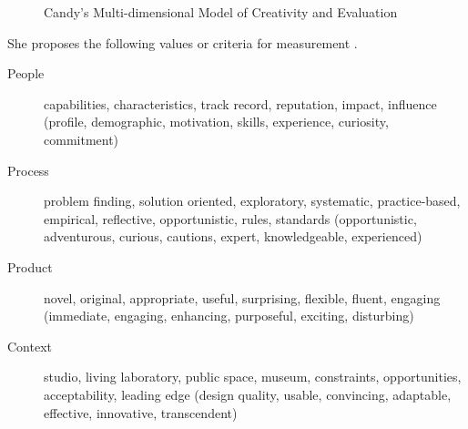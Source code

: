 \begin{figure}[!htbp]
  \caption[Candy's MMCE]{Candy's Multi-dimensional Model of Creativity and Evaluation}
  \label{fig:mmce}
\end{figure}

She proposes the following values or criteria for measurement \citeyear{Candy2012}.

\begin{description}
  \item [People] capabilities, characteristics, track record, reputation, impact, influence (profile, demographic, motivation, skills, experience, curiosity, commitment)
  \item [Process] problem finding, solution oriented, exploratory, systematic, practice-based, empirical, reflective, opportunistic, rules, standards (opportunistic, adventurous, curious, cautions, expert, knowledgeable, experienced)
  \item [Product] novel, original, appropriate, useful, surprising, flexible, fluent, engaging (immediate, engaging, enhancing, purposeful, exciting, disturbing)
  \item [Context] studio, living laboratory, public space, museum, constraints, opportunities, acceptability, leading edge (design quality, usable, convincing, adaptable, effective, innovative, transcendent)
\end{description}


